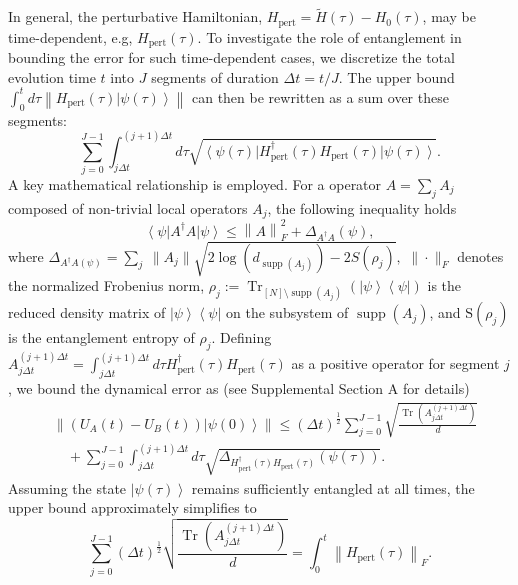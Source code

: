 \documentclass[12pt]{article}
\newcommand{\ket}[1]{\left|#1\right\rangle}
\newcommand{\bra}[1]{\left\langle #1\right|}
\newcommand{\norm}[1]{\left\lVert #1\right\rVert}
\newcommand{\Tr}{\operatorname{Tr}}
\DeclareMathOperator{\support}{supp}
\begin{document}
In general, the perturbative Hamiltonian, $H_{\text{pert}}=\widetilde{H}(\tau)-H_0(\tau)$, may be time-dependent, e.g, $H_{\text{pert}}(\tau)$. To investigate the role of entanglement in bounding the error for such time-dependent cases, we discretize the total evolution time $t$ into $J$ segments of duration $\Delta t= t/J$.  The upper bound $\int_0 ^t d\tau \norm{ H_{\text{pert}}(\tau)\ket{\psi(\tau)}}$ can then be rewritten as a sum over these segments: 
\begin{equation}
   \sum_{j=0}^{J-1} \int_{j\Delta t} ^{(j+1)\Delta t} d\tau \sqrt{\bra{\psi(\tau)} H_{\text{pert}}^\dagger(\tau)  H_{\text{pert}}(\tau) \ket{\psi(\tau)}}. \label{eqtimed}
\end{equation}
A key mathematical relationship is employed. For a operator $A=\sum_j A_j$ composed of non-trivial local operators  $A_j$, the following inequality holds~\cite{Zhao_2025NP} 
\begin{equation}
   \bra{\psi}A^\dagger A\ket{\psi}\le \norm{A}_F^2+\Delta_{A^\dagger A}(\psi),
\end{equation}
where $\Delta_{A^\dagger A(\psi)} =\sum_{j} ~\| A_j\| \sqrt{2\log(d_{\support(A_{j})})-2S(\rho_{j})},$
$\| \cdot\|_F$
denotes the normalized Frobenius norm, $\rho_{j}:=\Tr_{[N]\setminus \support(A_j)}(\ket{\psi}\bra{\psi})$ is the reduced density matrix of $\ket{\psi}\bra{\psi}$ on the subsystem of $\support(A_j)$, and $\text{S}(\rho_{j})$ is the entanglement entropy of $\rho_{j}$. 
Defining $A^{(j+1)\Delta t}_{j\Delta t}=\int_{j\Delta t} ^{(j+1)\Delta t} d\tau H_{\text{pert}}^\dagger(\tau)  H_{\text{pert}}(\tau) $ as a positive operator for segment $j$, we bound the dynamical error as (see Supplemental Section A for details)
\begin{equation}
\begin{split}
& \norm{(U_A(t)-U_B(t))\ket{\psi(0)}}
  \le (\Delta t)^{\frac{1}{2}} \sum_{j=0}^{J-1} \sqrt{\frac{\Tr(A^{(j+1)\Delta t}_{j\Delta t})}{d}} \\& \quad +
   \sum_{j=0}^{J-1}\int_{j\Delta t} ^{(j+1)\Delta t} d\tau  \sqrt{\Delta_{{H^\dagger_{\text{pert}}(\tau)H_{\text{pert}}(\tau)}} (\psi(\tau))  }.
   \end{split}
   \label{timed_methods}
\end{equation}
Assuming the state $\ket{\psi(\tau)}$ remains sufficiently entangled at all times, the upper bound approximately simplifies to
\begin{equation}
 \sum_{j=0}^{J-1} (\Delta t)^{\frac{1}{2}}\sqrt{\frac{\Tr(A^{(j+1)\Delta t}_{j\Delta t})}{d}}=\int_{0}^t \norm{H_{\text{pert}}(\tau)}_F.
    \label{eq:t-dependent_entangled}
\end{equation}
\end{document}
